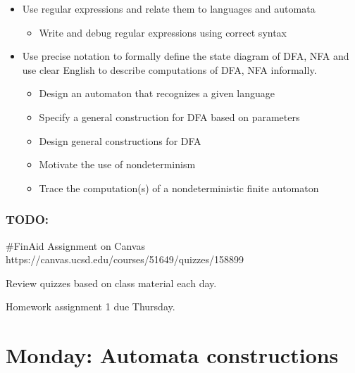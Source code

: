 \begin{itemize}
\item Use regular expressions and relate them to languages and automata
\begin{itemize}

   \item Write and debug regular expressions using correct syntax

\end{itemize}

\item Use precise notation to formally define the state diagram of DFA, NFA and 
use clear English to describe computations of DFA, NFA informally.

\begin{itemize}
   \item Design an automaton that recognizes a given language

   \item Specify a general construction for DFA based on parameters

   \item Design general constructions for DFA

   \item Motivate the use of nondeterminism

   \item Trace the computation(s) of a nondeterministic finite automaton

\end{itemize}






\end{itemize}

\subsubsection*{TODO:}
\begin{list}
   {\itemsep2pt}
   \item \#FinAid Assignment on Canvas https://canvas.ucsd.edu/courses/51649/quizzes/158899
   \item Review quizzes based on class material each day. 
   \item Homework assignment 1 due Thursday.
\end{list}

\newpage

\section*{Monday: Automata constructions}


